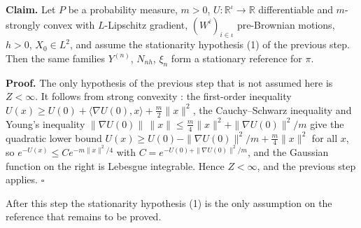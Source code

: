 \documentclass[11pt,a4paper]{article}
\begin{document}
\textbf{Claim.} Let \(P\) be a probability measure, \(m>0\), \(U:\mathbb R^\iota\to\mathbb R\) differentiable and \(m\)-strongly convex with \(L\)-Lipschitz gradient, \((W^i)_{i\in\iota}\) pre-Brownian motions, \(h>0\), \(X_0\in L^2\), and assume the stationarity hypothesis (1) of the previous step. Then the same families \(Y^{(n)}\), \(N_{nh}\), \(\xi_n\) form a stationary reference for \(\pi\).




\textbf{Proof.} The only hypothesis of the previous step that is not assumed here is \(Z<\infty\). It follows from strong convexity \cite[Section~3.26.10]{LangevinLean2026ULASC}: the first-order inequality \(U(x)\ge U(0)+\langle\nabla U(0),x\rangle+\frac m2\|x\|^2\), the Cauchy–Schwarz inequality and Young's inequality \(\|\nabla U(0)\|\,\|x\|\le\frac m4\|x\|^2+\|\nabla U(0)\|^2/m\) give the quadratic lower bound \(U(x)\ge U(0)-\|\nabla U(0)\|^2/m+\frac m4\|x\|^2\) for all \(x\), so \(e^{-U(x)}\le C e^{-m\|x\|^2/4}\) with \(C=e^{-U(0)+\|\nabla U(0)\|^2/m}\), and the Gaussian function on the right is Lebesgue integrable. Hence \(Z<\infty\), and the previous step applies. \(\square\)




After this step the stationarity hypothesis (1) is the only assumption on the reference that remains to be proved.
\end{document}
